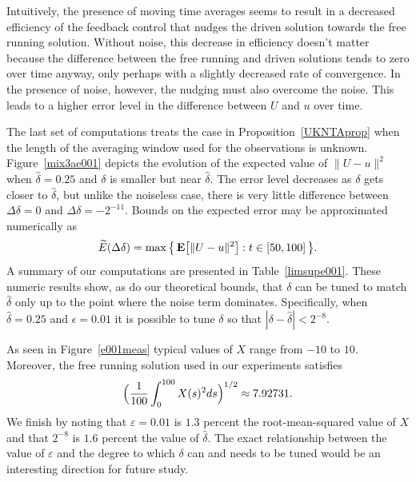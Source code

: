 \documentclass[master,tocprelim,12pt]{unrthesis}
\theoremstyle{definition}
\numberwithin{equation}{chapter}
\begin{document}
\begin{manuscript}
Intuitively, the presence of moving time averages seems to
result in a decreased efficiency of the feedback control
that nudges the driven solution towards the free running solution.
Without noise, this decrease in efficiency doesn't matter
because the difference between the free running and driven
solutions tends to zero over time anyway, only perhaps
with a slightly decreased rate of convergence.
In the presence of noise, however, the nudging must also
overcome the noise.
This leads to a higher error level in the difference
between $U$ and $u$ over time.

The last set of computations treats the case in
Proposition~\ref{UKNTAprop} when the length of
the averaging window used for the observations is unknown.
Figure~\ref{mix3ae001} depicts the evolution
of the expected value of $\|U-u\|^2$ when
$\hat\delta=0.25$ and $\delta$ is smaller but near $\hat\delta$.
The error level decreases as
$\delta$ gets closer to $\hat\delta$, but unlike the noiseless
case, there is very little difference between
$\Delta\delta=0$ and $\Delta\delta=-2^{-11}$.
Bounds on the expected error may be approximated
numerically as
$$
    \widetilde E(\Delta\delta)
    =\max\big\{\, {\bf E}\big[\|U-u\|^2\big] :
        t\in[50,100]\,\big\}.
$$
A summary of our computations are presented in
Table~\ref{limsupe001}.
These numeric results show, as do our theoretical bounds,
that $\delta$ can be tuned to match $\hat\delta$ only up to
the point where the noise term dominates.
Specifically,
when $\hat\delta=0.25$ and $\epsilon=0.01$
it is possible
to tune $\delta$ so that $|\delta-\hat\delta|< 2^{-8}$.

As seen in Figure~\ref{e001meas} typical values of $X$
range from $-10$ to $10$.  Moreover, the free running
solution used in our experiments satisfies
$$
    \Big({1\over 100}\int_0^{100} X(s)^2ds\Big)^{1/2}
        \approx 7.92731.
$$
We finish by noting that $\varepsilon=0.01$ is $1.3$
percent the root-mean-squared value of $X$ and that
$2^{-8}$ is $1.6$ percent the value of $\hat\delta$.
The exact relationship between the value of $\varepsilon$
and the degree to which $\delta$ can and needs to be tuned
would be an interesting direction for future study.


\end{manuscript}
\end{document}
